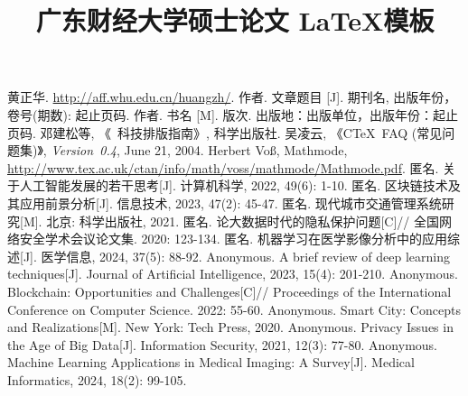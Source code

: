 \documentclass[class = professional, twoside, AutoFakeBold=3.17,AutoFakeSlant=0.2]{gdufe_master_thesis}
\begin{document}
\title{广东财经大学硕士论文 \LaTeX{}模板}
\pagestyle{empty}

\maketitle
\setlength{\baselineskip}{20pt} %
\frontmatter
\tableofcontents

\mainmatter
\cleardoublepage

\cleardoublepage

\cleardoublepage


\cleardoublepage
{}
\appendix
\begin{thebibliography}{00}
    黄正华. \url{http://aff.whu.edu.cn/huangzh/}.\the\baselineskip
     作者. 文章题目 [J].  期刊名, 出版年份，卷号(期数): 起止页码.\the\baselineskip
     作者. 书名 [M]. 版次. 出版地：出版单位，出版年份：起止页码.
     邓建松等, 《\LaTeXe~科技排版指南》, 科学出版社.
     吴凌云, 《CTeX~FAQ (常见问题集)》, \textit{Version~0.4}, June 21, 2004.
     Herbert Vo\ss, Mathmode, \url{http://www.tex.ac.uk/ctan/info/math/voss/mathmode/Mathmode.pdf}.
     匿名. 关于人工智能发展的若干思考[J]. 计算机科学, 2022, 49(6): 1-10.
     匿名. 区块链技术及其应用前景分析[J]. 信息技术, 2023, 47(2): 45-47.
     匿名. 现代城市交通管理系统研究[M]. 北京: 科学出版社, 2021.
     匿名. 论大数据时代的隐私保护问题[C]// 全国网络安全学术会议论文集. 2020: 123-134.
     匿名. 机器学习在医学影像分析中的应用综述[J]. 医学信息, 2024, 37(5): 88-92.
     Anonymous. A brief review of deep learning techniques[J]. Journal of Artificial Intelligence, 2023, 15(4): 201-210.
     Anonymous. Blockchain: Opportunities and Challenges[C]// Proceedings of the International Conference on Computer Science. 2022: 55-60.
     Anonymous. Smart City: Concepts and Realizations[M]. New York: Tech Press, 2020.
     Anonymous. Privacy Issues in the Age of Big Data[J]. Information Security, 2021, 12(3): 77-80.
     Anonymous. Machine Learning Applications in Medical Imaging: A Survey[J]. Medical Informatics, 2024, 18(2): 99-105.
\end{thebibliography}

\printbibliography[heading=bibintoc, title={参考文献--bib}]



\end{document}
